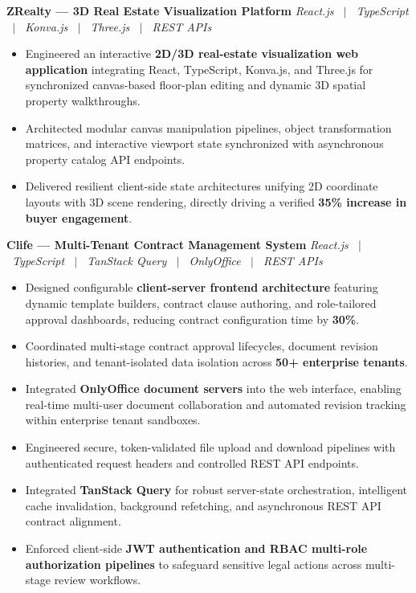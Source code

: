 \documentclass[letterpaper,10pt]{article}
\newcommand{\resumeProject}[2]{%
  \vspace{2pt}%
  \textbf{#1} \hfill \textit{#2}\\[-6pt]
}
\begin{document}
\resumeProject
  {ZRealty --- 3D Real Estate Visualization Platform}{React.js \ $|$ \ TypeScript \ $|$ \ Konva.js \ $|$ \ Three.js \ $|$ \ REST APIs}
\begin{itemize}
  \item Engineered an interactive \textbf{2D/3D real-estate visualization web application} integrating React, TypeScript, Konva.js, and Three.js for synchronized canvas-based floor-plan editing and dynamic 3D spatial property walkthroughs.
  \item Architected modular canvas manipulation pipelines, object transformation matrices, and interactive viewport state synchronized with asynchronous property catalog API endpoints.
  \item Delivered resilient client-side state architectures unifying 2D coordinate layouts with 3D scene rendering, directly driving a verified \textbf{35\% increase in buyer engagement}.
\end{itemize}
\vspace{0.3cm}
\resumeProject
  {Clife --- Multi-Tenant Contract Management System}{React.js \ $|$ \ TypeScript \ $|$ \ TanStack Query \ $|$ \ OnlyOffice \ $|$ \ REST APIs}
\begin{itemize}
  \item Designed configurable \textbf{client-server frontend architecture} featuring dynamic template builders, contract clause authoring, and role-tailored approval dashboards, reducing contract configuration time by \textbf{30\%}.
  \item Coordinated multi-stage contract approval lifecycles, document revision histories, and tenant-isolated data isolation across \textbf{50+ enterprise tenants}.
  \item Integrated \textbf{OnlyOffice document servers} into the web interface, enabling real-time multi-user document collaboration and automated revision tracking within enterprise tenant sandboxes.
  \item Engineered secure, token-validated file upload and download pipelines with authenticated request headers and controlled REST API endpoints.
  \item Integrated \textbf{TanStack Query} for robust server-state orchestration, intelligent cache invalidation, background refetching, and asynchronous REST API contract alignment.
  \item Enforced client-side \textbf{JWT authentication and RBAC multi-role authorization pipelines} to safeguard sensitive legal actions across multi-stage review workflows.
\end{itemize}
\end{document}
